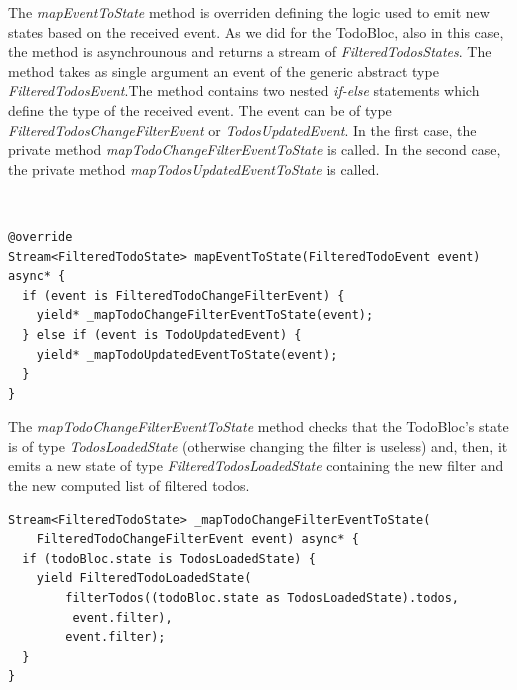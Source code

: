 The \textit{mapEventToState }method is overriden defining the logic used to emit new states based on the received event. As we did for the TodoBloc, also in this case, the method is asynchrounous and returns a stream of \textit{FilteredTodosStates}. The method takes as single argument an event of the generic abstract type \textit{FilteredTodosEvent}.The method contains two nested \textit{if-else} statements which define the type of the received event. The event can be of type \textit{FilteredTodosChangeFilterEvent} or \textit{TodosUpdatedEvent}. In the first case, the private method \textit{mapTodoChangeFilterEventToState} is called. In the second case, the private method \textit{mapTodosUpdatedEventToState} is called. 
\begin{code}
\mbox{}\\
 \mbox{}
\label{code:2.14}
\begin{verbatim}
@override
Stream<FilteredTodoState> mapEventToState(FilteredTodoEvent event) async* {
  if (event is FilteredTodoChangeFilterEvent) {
    yield* _mapTodoChangeFilterEventToState(event);
  } else if (event is TodoUpdatedEvent) {
    yield* _mapTodoUpdatedEventToState(event);
  }
}
\end{verbatim}
\mbox{}
\end{code}

The \textit{mapTodoChangeFilterEventToState} method  checks that the TodoBloc's state is of type \textit{TodosLoadedState} (otherwise changing the filter is useless) and, then, it emits a new state of type \textit{FilteredTodosLoadedState} containing the new filter and the new computed list of filtered todos.

\begin{code}
\mbox{}
 \mbox{}
\label{code:2.14}
\begin{verbatim}
Stream<FilteredTodoState> _mapTodoChangeFilterEventToState(
    FilteredTodoChangeFilterEvent event) async* {
  if (todoBloc.state is TodosLoadedState) {
    yield FilteredTodoLoadedState(
        filterTodos((todoBloc.state as TodosLoadedState).todos,
         event.filter),
        event.filter);
  }
}
\end{verbatim}
\mbox{}
\end{code}

